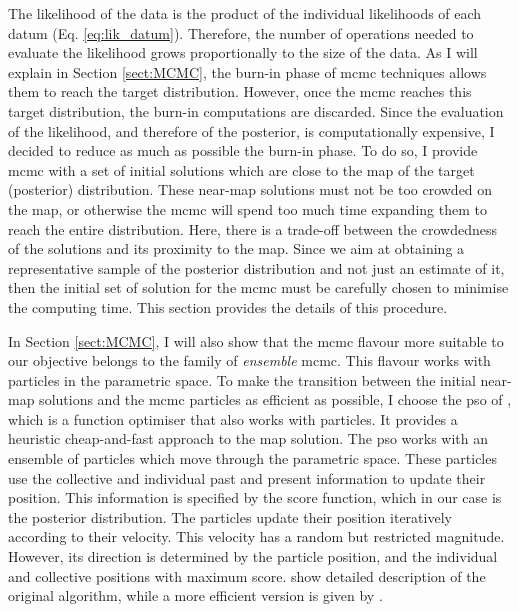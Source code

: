 The likelihood of the data is the product of the individual likelihoods of each datum (Eq. \ref{eq:lik_datum}). Therefore, the number of operations needed to evaluate the likelihood grows proportionally to the size of the data. As I will explain in Section \ref{sect:MCMC}, the burn-in phase of \gls{mcmc} techniques allows them to reach the target distribution. However, once the \gls{mcmc} reaches this target distribution, the burn-in computations are discarded. Since the evaluation of the likelihood, and therefore of the posterior, is computationally expensive, I decided to reduce as much as possible the burn-in phase. To do so, I provide \gls{mcmc} with a set of initial solutions which are close to the \gls{map} of the target (posterior) distribution. These near-\gls{map} solutions must not be too crowded on the \gls{map}, or otherwise the \gls{mcmc} will spend too much time expanding them to reach the entire distribution. Here, there is a trade-off between the crowdedness of the solutions and its proximity to the \gls{map}. Since we aim at obtaining a representative sample of the posterior distribution and not just an estimate of it, then the initial set of solution for the \gls{mcmc} must be carefully chosen to minimise the computing time. This section provides the details of this procedure. 

{In Section \ref{sect:MCMC}, I will also show that the \gls{mcmc} flavour more suitable to our objective belongs to the family of \emph{ensemble} \gls{mcmc}. This flavour works with particles in the parametric space. To make the transition between the initial near-\gls{map} solutions and the  \gls{mcmc} particles as efficient as possible, I choose the \gls{pso} of  \citet{Kennedy1995}, which is a function optimiser that also works with particles. It provides a heuristic cheap-and-fast approach to the \gls{map} solution. The \gls{pso} works with an ensemble of particles which move through the parametric space.} These particles use the collective and individual past and present information to update their position. This information is specified by the score function, which in our case is the posterior distribution. The particles update their position iteratively according to their velocity. This velocity has a random but restricted magnitude. However, its direction is determined by the particle position, and the individual and collective positions with maximum score. \citet{Kennedy1995} show detailed description of the original algorithm, while a more efficient version is given by \citep{Clerc2002}.

